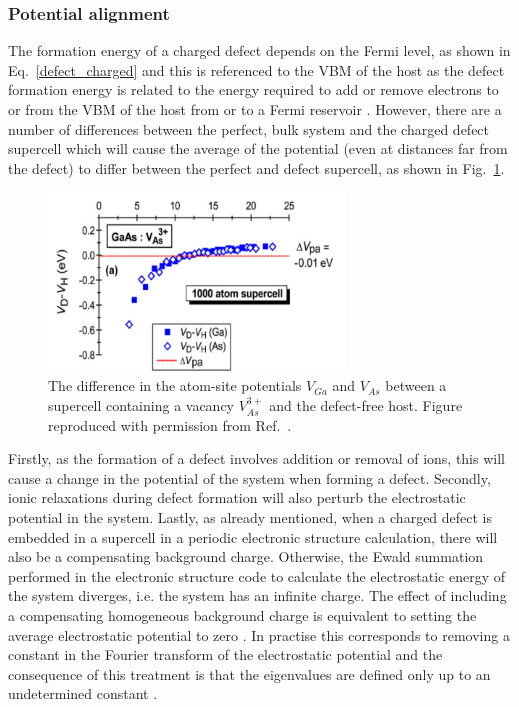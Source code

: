 \documentclass[11pt, twoside]{report}
\begin{document}
\subsubsection{Potential alignment}
The formation energy of a charged defect depends on the Fermi level, as shown in Eq.~\ref{defect_charged} and this is referenced to the VBM of the host as the defect formation energy is related to the energy required to add or remove electrons to or from the VBM of the host from or to a Fermi reservoir \cite{Alex_defects}.
However, there are a number of differences between the perfect, bulk system and the charged defect supercell which will cause the average of the potential (even at distances far from the defect) to differ between the perfect and defect supercell, as shown in Fig.~\ref{pa}.
\begin{figure}[h!]
  \centering
    \includegraphics[width=0.7\textwidth]{figures/pa.png}
    \caption[The difference in the atom-site potentials $V_{Ga}$ and $V_{As}$ between a supercell containing a vacancy $V_{As}^{3+}$ and the defect-free host.]{The difference in the atom-site potentials $V_{Ga}$ and $V_{As}$ between a supercell containing a vacancy $V_{As}^{3+}$ and the defect-free host. Figure reproduced with permission from Ref.~.}
  \label{pa}
\end{figure}

Firstly, as the formation of a defect involves addition or removal of ions, this will cause a change in the potential of the system when forming a defect. Secondly, ionic relaxations during defect formation will also perturb the electrostatic potential in the system. Lastly, as already mentioned, when a charged defect is embedded in a supercell in a periodic electronic structure calculation, there will also be a compensating background charge. Otherwise, the Ewald summation performed in the electronic structure code to calculate the electrostatic energy of the system diverges, i.e. the system has an infinite charge. The effect of including a compensating homogeneous background charge is equivalent to setting the average electrostatic potential to zero \cite{freysoldt_rev}. 
In practise this corresponds to removing a constant in the Fourier transform of the electrostatic potential and the consequence of this treatment is that the eigenvalues are defined only up to an undetermined constant \cite{kumagai_oba, kumagai_oba_9}.
\end{document}
